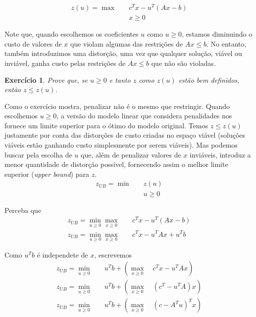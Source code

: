 \documentclass[]{article}
\newtheorem{exercicio}{Exercício}
\numberwithin{equation}{section}
\begin{document}
\begin{align}
z(u) =  \max  &\quad  c^Tx - u^T(Ax - b)  \\
              &\quad  x \geq 0
\end{align}

Note que, quando escolhemos os coeficientes $u$ como $u \geq 0$, estamos diminuindo o
custo de valores de $x$ que violam algumas das restrições de $Ax \leq b$.
No entanto, também introduzimos uma distorção, uma vez que qualquer solução, viável ou
inviável, ganha custo pelas restrições de $Ax \leq b$ que não são violadas.

\begin{exercicio}
  Prove que, se $u \geq 0$ e tanto $z$ como $z(u)$ estão bem definidos, então
  $z \leq z(u)$.
\end{exercicio}

Como o exercício mostra, penalizar não é o mesmo que restringir.
Quando escolhemos $u \geq 0$, a versão do modelo linear que considera penalidades nos fornece um limite
superior para o ótimo do modelo original.
Temos $z \leq z(u)$ justamente por conta das distorções de custo criadas no espaço viável (soluções
viáveis estão ganhando custo simplesmente por serem viáveis).
Mas podemos buscar pela escolha de $u$ que, além de penalizar valores de $x$ inviáveis, introduz a
menor quantidade de distorção possível, fornecendo assim o melhor limite superior (\emph{upper bound})
para $z$.
\begin{align}
z_{UB} =  \min  &\quad  z(u) \\
                &\quad  u \geq 0
\end{align}

Perceba que
\begin{align}
z_{UB} =  \min_{u \geq 0}
          \max_{x \geq 0} &\quad  c^Tx - u^T(Ax - b) \\
z_{UB} =  \min_{u \geq 0}
          \max_{x \geq 0} &\quad  c^Tx - u^TAx + u^Tb
\end{align}

Como $u^Tb$ é independete de $x$, escrevemos
\begin{align}
z_{UB} =  \min_{u \geq 0} &\quad  u^Tb +
          \left( \max_{x \geq 0} \quad c^Tx - u^TAx \right)  \\
z_{UB} =  \min_{u \geq 0} &\quad  u^Tb +
          \left( \max_{x \geq 0} \quad (c^T - u^TA)x \right) \\
z_{UB} =  \min_{u \geq 0} &\quad  u^Tb +
          \left( \max_{x \geq 0} \quad (c - A^Tu)^Tx \right)
\end{align}
\end{document}
